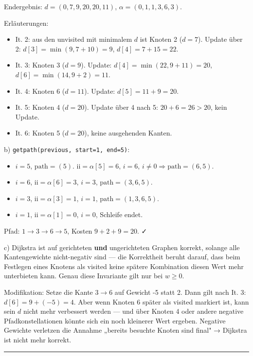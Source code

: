 \documentclass[11pt, a4paper]{article}
\begin{document}
Endergebnis: $d=(0,7,9,20,20,11)$, $\alpha=(0,1,1,3,6,3)$.


Erläuterungen:

\begin{itemize}
  \item It. 2: aus den unvisited mit minimalem $d$ ist Knoten 2 ($d=7$). Update über 2: $d[3]=\min(9,7+10)=9$, $d[4]=7+15=22$.
  \item It. 3: Knoten 3 ($d=9$). Update: $d[4]=\min(22,9+11)=20$, $d[6]=\min(14,9+2)=11$.
  \item It. 4: Knoten 6 ($d=11$). Update: $d[5]=11+9=20$.
  \item It. 5: Knoten 4 ($d=20$). Update über 4 nach 5: $20+6=26 > 20$, kein Update.
  \item It. 6: Knoten 5 ($d=20$), keine ausgehenden Kanten.
\end{itemize}

b) \texttt{getpath(previous, start=1, end=5)}:

\begin{itemize}
  \item $i=5$, $\text{path}=(5)$. $\text{ii}=\alpha[5]=6$, $i=6$, $i\neq 0 \Rightarrow \text{path}=(6,5)$.
  \item $i=6$, $\text{ii}=\alpha[6]=3$, $i=3$, $\text{path}=(3,6,5)$.
  \item $i=3$, $\text{ii}=\alpha[3]=1$, $i=1$, $\text{path}=(1,3,6,5)$.
  \item $i=1$, $\text{ii}=\alpha[1]=0$, $i=0$, Schleife endet.
\end{itemize}

Pfad: $1 \to 3 \to 6 \to 5$, Kosten $9+2+9 = 20$. ✓


c) Dijkstra ist auf gerichteten \textbf{und} ungerichteten Graphen korrekt, solange alle Kantengewichte nicht-negativ sind — die Korrektheit beruht darauf, dass beim Festlegen eines Knotens als visited keine spätere Kombination diesen Wert mehr unterbieten kann. Genau diese Invariante gilt nur bei $w \geq 0$.


Modifikation: Setze die Kante $3\to 6$ auf Gewicht -5 statt 2. Dann gilt nach It. 3: $d[6]=9+(-5)=4$. Aber wenn Knoten 6 später als visited markiert ist, kann sein $d$ nicht mehr verbessert werden — und über Knoten 4 oder andere negative Pfadkonstellationen könnte sich ein noch kleinerer Wert ergeben. Negative Gewichte verletzen die Annahme „bereits besuchte Knoten sind final" → Dijkstra ist nicht mehr korrekt.



\noindent\textcolor{rulegray}{\rule{\linewidth}{0.4pt}}
\end{document}
